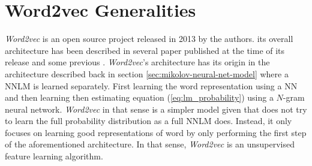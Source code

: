 





\section{Word2vec Generalities}
\label{sec:word2v-generalities}

\textit{Word2vec} is an open source project released in 2013 by the authors.
its overall architecture has been described in several paper published at the
time of its release
\cite{DBLP:journals/corr/abs-1301-3781,MikolovSCCD13,conf/naacl/MikolovYZ13}
and some previous  \cite{mikolovphd2012}.  \textit{Word2vec}'s architecture
has its origin  in the architecture described back in section 
\ref{sec:mikolov-neural-net-model} where a \ac{NNLM} is learned separately. 
First learning the word representation using a \ac{NN} and then learning then
estimating equation (\ref{eq:lm_probability}) using a $N$-gram neural
network.  \textit{Word2vec} in that sense is a simpler model given that does not try to
learn the full probability distribution as a full \ac{NNLM} does. Instead, it
only focuses on learning good representations of word by  only performing  the first step
of the aforementioned architecture.  In that sense, \textit{Word2vec} is an
unsupervised feature learning algorithm.

